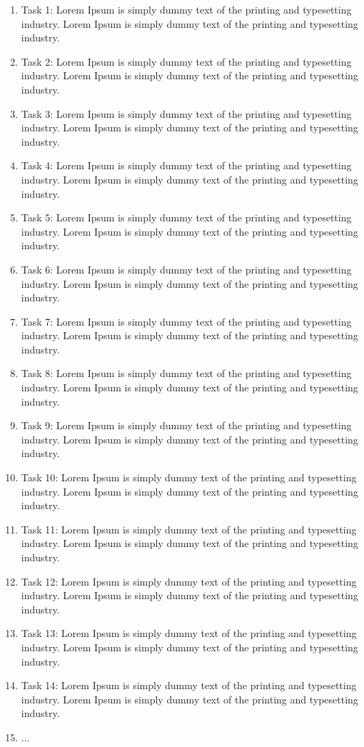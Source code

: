 \documentclass{article}
\begin{document}
\vspace{1em}

\begin{enumerate}
    \item Task 1: Lorem Ipsum is simply dummy text of the printing and typesetting industry. Lorem Ipsum is simply dummy text of the printing and typesetting industry.
    \item Task 2: Lorem Ipsum is simply dummy text of the printing and typesetting industry. Lorem Ipsum is simply dummy text of the printing and typesetting industry.
    \item Task 3: Lorem Ipsum is simply dummy text of the printing and typesetting industry. Lorem Ipsum is simply dummy text of the printing and typesetting industry.
    \item Task 4: Lorem Ipsum is simply dummy text of the printing and typesetting industry. Lorem Ipsum is simply dummy text of the printing and typesetting industry.
    \item Task 5: Lorem Ipsum is simply dummy text of the printing and typesetting industry. Lorem Ipsum is simply dummy text of the printing and typesetting industry.
    \item Task 6: Lorem Ipsum is simply dummy text of the printing and typesetting industry. Lorem Ipsum is simply dummy text of the printing and typesetting industry.
    \item Task 7: Lorem Ipsum is simply dummy text of the printing and typesetting industry. Lorem Ipsum is simply dummy text of the printing and typesetting industry.
    \item Task 8: Lorem Ipsum is simply dummy text of the printing and typesetting industry. Lorem Ipsum is simply dummy text of the printing and typesetting industry.
    \item Task 9: Lorem Ipsum is simply dummy text of the printing and typesetting industry. Lorem Ipsum is simply dummy text of the printing and typesetting industry.
    \item Task 10: Lorem Ipsum is simply dummy text of the printing and typesetting industry. Lorem Ipsum is simply dummy text of the printing and typesetting industry.
    \item Task 11: Lorem Ipsum is simply dummy text of the printing and typesetting industry. Lorem Ipsum is simply dummy text of the printing and typesetting industry.
    \item Task 12: Lorem Ipsum is simply dummy text of the printing and typesetting industry. Lorem Ipsum is simply dummy text of the printing and typesetting industry.
    \item Task 13: Lorem Ipsum is simply dummy text of the printing and typesetting industry. Lorem Ipsum is simply dummy text of the printing and typesetting industry.
    \item Task 14: Lorem Ipsum is simply dummy text of the printing and typesetting industry. Lorem Ipsum is simply dummy text of the printing and typesetting industry.
    \item ...
        
\end{enumerate}
\end{document}
